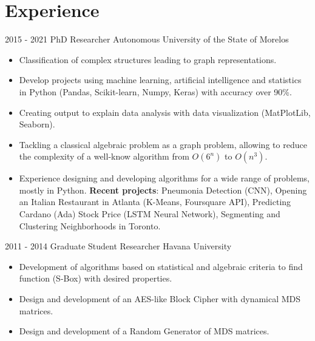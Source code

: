 \documentclass[]{friggeri-cv}
\begin{document}
\section{Experience}
\begin{entrylist}
\vspace{-.2in}
     \entry
    {2015 - 2021}
    {PhD Researcher}
    {Autonomous University of the State of Morelos}
    {\vspace{-.1in}
\begin{itemize}
\item Classification of complex structures leading to graph representations.
\item   Develop  projects using machine learning, artificial intelligence and statistics in Python (Pandas, Scikit-learn, Numpy, Keras) with  accuracy over  90\%.
  \item  Creating output to explain data analysis with data visualization (MatPlotLib, Seaborn).
\item Tackling a classical algebraic problem as a graph problem, allowing to reduce the complexity of a well-know algorithm from $O(6^n)$ to $O(n^3)$. 
\item  Experience designing and developing algorithms for a wide range of problems, mostly in Python.  \textbf{Recent projects}:  Pneumonia Detection (CNN),  Opening an Italian Restaurant in Atlanta (K-Means, Foursquare API), Predicting Cardano (Ada) Stock Price (LSTM Neural Network), Segmenting and Clustering Neighborhoods in Toronto.\\
\end{itemize}    
   
   }
  \entry
    {2011 - 2014}
    { Graduate Student Researcher}
    {Havana University}
    { \vspace{-.1in}
    \begin{itemize}
    \item  Development of algorithms based on statistical and algebraic criteria to find function (S-Box) with desired properties.
    \item Design and development of an AES-like  Block Cipher with dynamical MDS matrices.
    \item Design and development of a Random Generator of MDS matrices.
    \end{itemize}
 } 
\end{entrylist}
\end{document}
